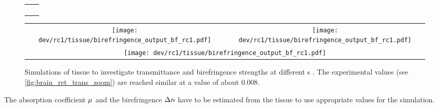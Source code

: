 \begin{figure}[p]
\centering
\setlength{\tikzwidth}{0.425\textwidth}
\setlength{\tabcolsep}{0em}
\begin{tabular}{C{0.5\textwidth}C{0.5\textwidth}}
%
\tikzset{external/export next=false}%
 &
 \\[-5mm]
%
 &
 \\[10mm]
%
\tikzset{external/export next=false}
 &
 \\[-5mm]
%
 &
 \\
%
\end{tabular}
\caption{%
trans left: $1200 \pm 500$,
trans right: $1200 \pm 500$,
bg: $4530 \pm 240$,
fuellgrad $0.75: \mu \approx 30 \pm 10$,
fuellgrad $0.75: \mu \approx 30 \pm 10$,
ret left: $0.83 \pm 0.07$,
ret right: $0.80 \pm 0.07$
}
\label{fig:brain_ret_trans_zoom}
%
%
%
\vspace*{2em}
\begin{tabular}{cc}
\texttt{[image: dev/rc1/tissue/birefringence\_output\_bf\_rc1.pdf]}&
\texttt{[image: dev/rc1/tissue/birefringence\_output\_bf\_rc1.pdf]}\\[1em]
\multicolumn{2}{c}{\texttt{[image: dev/rc1/tissue/birefringence\_output\_bf\_rc1.pdf]}}
\end{tabular}
\caption{Simulations of tissue to investigate transmittance and birefringence strengths at different \Voxelsize s \voxelsize{}. The experimental values (see \cref{fig:brain_ret_trans_zoom}) are reached similar at a value of about $\si{0.008}{}$.}
\label{fig:parameterModelSim}
\end{figure}
%
The absorption coefficient $\textnormal{$\mu$}{}$ and the birefringence $\textnormal{$\Delta n$}{}$ have to be estimated from the tissue to use appropriate values for the simulation.
